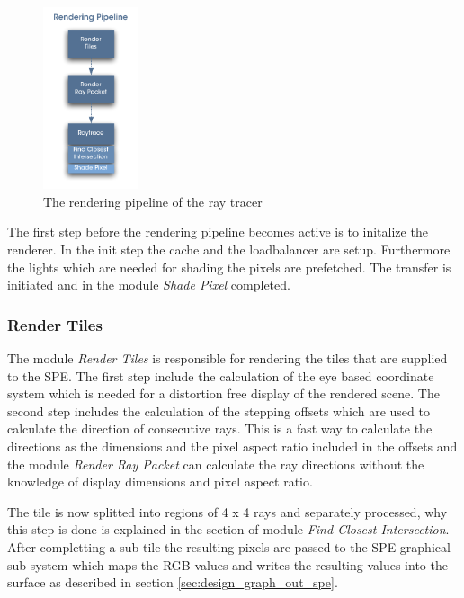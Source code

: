 \documentclass[DIV10, abstracton, openright, footsepline, headsepline, twoside, 9pt,
bigheadings]{scrreprt}
\begin{document}
\begin{figure}[H]
\centering
\includegraphics[width=0.25\textwidth]{diagramme/render_pipeline}
\caption{The rendering pipeline of the ray tracer}
\label{fig:render_pipeline}
\end{figure}

The first step before the rendering pipeline becomes active is to initalize
the renderer. In the init step the cache and the loadbalancer are setup.
Furthermore the lights which are needed for shading the pixels are prefetched.
The transfer is initiated and in the module \textit{Shade Pixel} completed.


\subsubsection*{Render Tiles}
\label{sec:design_render_tiles}
The module \textit{Render Tiles} is responsible for rendering the tiles
that are supplied to the SPE. The first step include the calculation of
the eye based coordinate system which is needed  for a distortion free
display of the  rendered scene.  The second step includes the calculation
of the stepping offsets which are used to calculate the direction of
consecutive rays. This is a fast way to calculate the directions as
the dimensions and the pixel aspect ratio included in the offsets and the
module \textit{Render Ray Packet} can calculate the ray directions without
the knowledge of display dimensions and pixel aspect ratio.

The tile is now splitted into regions of 4 x 4 rays and separately processed,
why this step is done is explained in the section of module
\textit{Find Closest Intersection}.
After completting a sub tile the resulting pixels are passed to the
SPE graphical sub system which maps the RGB values and writes the resulting
values into the surface as described in section \ref{sec:design_graph_out_spe}.
\end{document}

